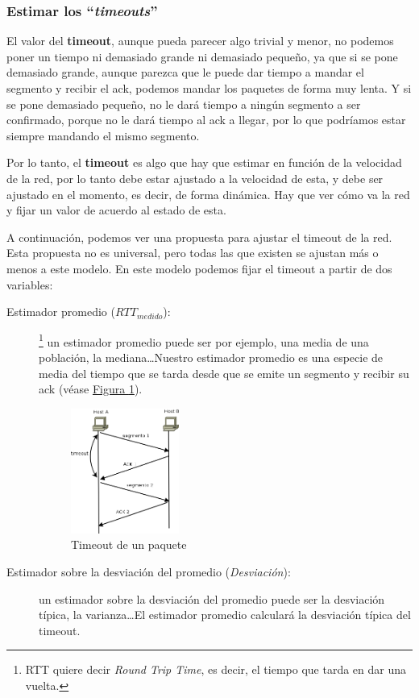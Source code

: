 \documentclass[10pt,a4paper,spanish]{report}
\begin{document}
\subsubsection{\textcolor{tema3}Estimar los ``\textit{timeouts}''}

El valor del \textbf{\textcolor{tema3}{timeout}}, aunque pueda parecer algo trivial y menor, no podemos poner un tiempo ni demasiado grande ni demasiado pequeño, ya que si se pone demasiado grande, aunque parezca que le puede dar tiempo a mandar el segmento y recibir el ack, podemos mandar los paquetes de forma muy lenta. Y si se pone demasiado pequeño, no le dará tiempo a ningún segmento a ser confirmado, porque no le dará tiempo al ack a llegar, por lo que podríamos estar siempre mandando el mismo segmento. 

Por lo tanto, el \textbf{\textcolor{tema3}{timeout}} es algo que hay que estimar en función de la velocidad de la red, por lo tanto debe estar ajustado a la velocidad de esta, y debe ser ajustado en el momento, es decir, de forma dinámica. Hay que ver cómo va la red y fijar un valor de acuerdo al estado de esta.

A continuación, podemos ver una propuesta para ajustar el timeout de la red. Esta propuesta no es universal, pero todas las que existen se ajustan más o menos a este modelo. En este modelo podemos fijar el timeout a partir de dos variables:

\begin{description}
  \item[Estimador promedio ($RTT_{medido}$):]\footnote{RTT quiere decir \textit{\textcolor{tema3}{Round Trip Time}}, es decir, el tiempo que tarda en dar una vuelta.} un estimador promedio puede ser por ejemplo, una media de una población, la mediana\ldots Nuestro estimador promedio es una especie de media del tiempo que se tarda desde que se emite un segmento y recibir su ack (véase \hyperref[rtt]{Figura \ref*{rtt}}). 
  
  \begin{figure}[H]
    \centering
    \includegraphics[width=0.35\textwidth]{timeout}
    \caption{Timeout de un paquete}
    \label{rtt}
  \end{figure}

  \item[Estimador sobre la desviación del promedio (\textit{Desviación}):] un estimador sobre la desviación del promedio puede ser la desviación típica, la varianza\ldots El estimador promedio calculará la desviación típica del timeout.
\end{description}
\end{document}
